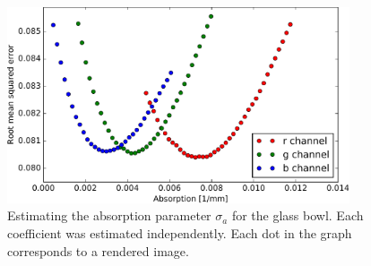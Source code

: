 \begin{figure}
\centering
\includegraphics[width=0.9\textwidth]{figures/glass_bowl_analysis_by_synthesis}  \caption{Estimating the absorption parameter $\sigma_a$ for the glass bowl. Each coefficient was estimated independently. Each dot in the graph corresponds to a rendered image. }
\label{fig:glasscomparisongraph}
\end{figure}

